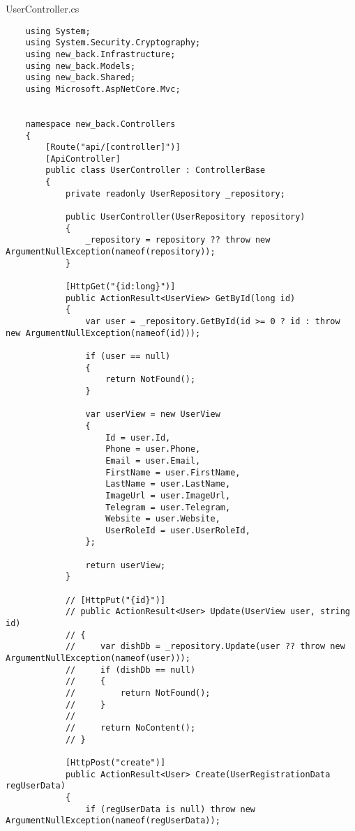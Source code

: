 UserController.cs
\lstset{style=sharpc}
\begin{lstlisting}
    using System;
    using System.Security.Cryptography;
    using new_back.Infrastructure;
    using new_back.Models;
    using new_back.Shared;
    using Microsoft.AspNetCore.Mvc;
    
    
    namespace new_back.Controllers
    {
        [Route("api/[controller]")]
        [ApiController]
        public class UserController : ControllerBase
        {
            private readonly UserRepository _repository;
            
            public UserController(UserRepository repository)
            {
                _repository = repository ?? throw new ArgumentNullException(nameof(repository));
            }
            
            [HttpGet("{id:long}")]
            public ActionResult<UserView> GetById(long id)
            {
                var user = _repository.GetById(id >= 0 ? id : throw new ArgumentNullException(nameof(id)));
                
                if (user == null)
                {
                    return NotFound();
                }
                
                var userView = new UserView
                {
                    Id = user.Id,
                    Phone = user.Phone,
                    Email = user.Email,
                    FirstName = user.FirstName,
                    LastName = user.LastName,
                    ImageUrl = user.ImageUrl,
                    Telegram = user.Telegram,
                    Website = user.Website,
                    UserRoleId = user.UserRoleId,
                };
                
                return userView;
            }
            
            // [HttpPut("{id}")]
            // public ActionResult<User> Update(UserView user, string id)
            // {
            //     var dishDb = _repository.Update(user ?? throw new ArgumentNullException(nameof(user)));
            //     if (dishDb == null)
            //     {
            //         return NotFound();
            //     }
            //
            //     return NoContent();
            // }
    
            [HttpPost("create")]
            public ActionResult<User> Create(UserRegistrationData regUserData)
            {
                if (regUserData is null) throw new ArgumentNullException(nameof(regUserData));
    

\end{lstlisting}
